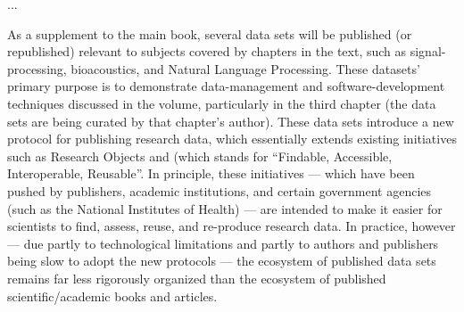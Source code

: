 \documentclass[11pt,letterpaper]{article}
\newcommand{\sectsp}{\vspace{12pt}}
\newcommand{\FAIR}{\resizebox{!}{7.5pt}{\AcronymText{FAIR}}}
\newcommand{\textscc}[1]{{\color{orr!35!black}{{%
						\fontfamily{Cabin-TLF}\fontseries{b}\selectfont{\textsc{\scriptsize{#1}}}}}}}
\newcommand{\AcronymText}[1]{{\textscc{#1}}}
\newcommand{\p}[1]{

\vspace{.85em}#1}
\newcommand{\q}[1]{{\fontfamily{qcr}\selectfont ``}#1{\fontfamily{qcr}\selectfont ''}}
\newcommand{\llMOSAIC}{\mbox{{\LARGE MOSAIC}}}
\newcommand{\llWC}{\mbox{{\LARGE WhiteCharmDB}}}
\newcommand{\lun}[1]{\raisebox{-4pt}{\fontfamily{qcr}\selectfont{%
\LARGE{\textbf{\textcolor{tcolor}{#1}}}}}\vspace{-2pt}}
\begin{document}
	
{\linespread{1.1}\selectfont

\vspace*{-7em}

\begin{center}


\vspace{1em}


\begin{tcolorbox}
[
arc=2pt,outer arc=0pt,
enhanced jigsaw,
width=.984\textwidth,
colback=ctmpppp!30,
colframe=logoRed!30!darkRed,
drop shadow=logoPurple!50!darkRed,
]
\begin{minipage}{\textwidth}	
\begin{center}		
{\setlength{\fboxsep}{19pt}
	}
\end{center}
\end{minipage}
\end{tcolorbox}
\end{center}

\vspace{-1.5em}

...
\p{As a supplement to the main book, 
several data sets will be published (or 
republished) relevant to subjects covered by 
chapters in the text, such as signal-processing, 
bioacoustics, and Natural Language Processing.  
These datasets' primary purpose is to demonstrate 
data-management and software-development techniques 
discussed in the volume, particularly in the 
third chapter (the data sets are being curated by that 
chapter's author).  These data sets introduce a new 
protocol for publishing research data, which essentially 
extends existing initiatives such as Research Objects 
and \FAIR{} (which stands for \q{Findable, Accessible, 
Interoperable, Reusable}.  In principle, these initiatives 
--- which have been pushed by publishers, academic 
institutions, and certain government agencies 
(such as the National Institutes of Health) --- are intended to make 
it easier for scientists to find, assess, 
reuse, and re-produce research data.  
In practice, however --- due partly to  
technological limitations and partly to 
authors and publishers being slow to adopt 
the new protocols --- the ecosystem of 
published data sets remains far less rigorously 
organized than the ecosystem of published 
scientific/academic books and articles.}

}
\end{document}
